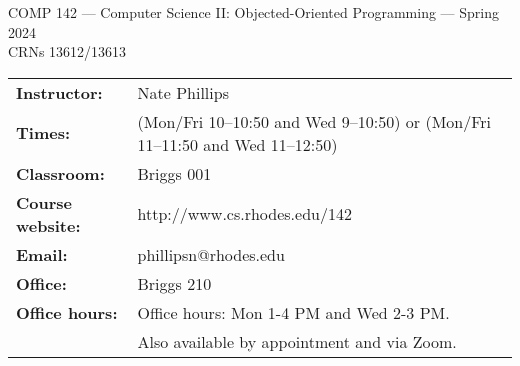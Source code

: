 \documentclass [letterpaper,11pt]{article}
\begin{document}
\begin{center}
\large COMP 142 --- Computer Science II: Objected-Oriented Programming --- Spring 2024
\\ \normalsize CRNs 13612/13613
\end{center}

\noindent\begin{tabular}{@{}ll}
\textbf{Instructor:} & Nate Phillips \\
\textbf{Times:} & (Mon/Fri 10--10:50 and Wed 9--10:50) or (Mon/Fri 11--11:50 and Wed 11--12:50) \\
\textbf{Classroom:} & Briggs 001 \\
\textbf{Course website:} & http://www.cs.rhodes.edu/142\\
\textbf{Email:} &phillipsn@rhodes.edu\\
\textbf{Office:} & Briggs 210\\
\textbf{Office hours:} & Office hours: Mon 1-4 PM and Wed 2-3 PM. \\&Also available by appointment and via Zoom.\\
\end{tabular}
\end{document}
